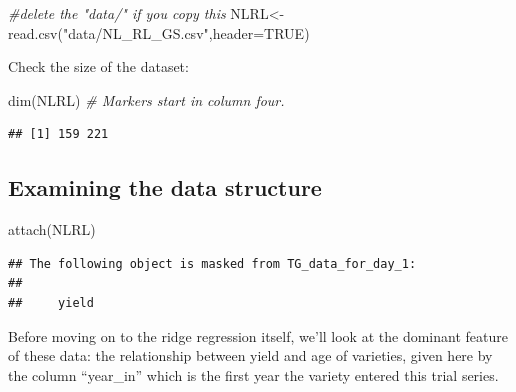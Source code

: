 \documentclass[
]{book}
\newenvironment{Shaded}{\begin{snugshade}}{\end{snugshade}}
\newcommand{\AttributeTok}[1]{\textcolor[rgb]{0.77,0.63,0.00}{#1}}
\newcommand{\CommentTok}[1]{\textcolor[rgb]{0.56,0.35,0.01}{\textit{#1}}}
\newcommand{\ConstantTok}[1]{\textcolor[rgb]{0.00,0.00,0.00}{#1}}
\newcommand{\FunctionTok}[1]{\textcolor[rgb]{0.00,0.00,0.00}{#1}}
\newcommand{\NormalTok}[1]{#1}
\newcommand{\OtherTok}[1]{\textcolor[rgb]{0.56,0.35,0.01}{#1}}
\newcommand{\SpecialCharTok}[1]{\textcolor[rgb]{0.00,0.00,0.00}{#1}}
\newcommand{\StringTok}[1]{\textcolor[rgb]{0.31,0.60,0.02}{#1}}
\begin{document}
\begin{Shaded}
\begin{Highlighting}[]
\CommentTok{\#delete the "data/" if you copy this}
\NormalTok{NLRL}\OtherTok{\textless{}{-}}\FunctionTok{read.csv}\NormalTok{(}\StringTok{"data/NL\_RL\_GS.csv"}\NormalTok{,}\AttributeTok{header=}\ConstantTok{TRUE}\NormalTok{)}
\end{Highlighting}
\end{Shaded}

Check the size of the dataset:

\begin{Shaded}
\begin{Highlighting}[]
\FunctionTok{dim}\NormalTok{(NLRL) }\CommentTok{\# Markers start in column four.}
\end{Highlighting}
\end{Shaded}

\begin{verbatim}
## [1] 159 221
\end{verbatim}

\hypertarget{examining-the-data-structure}{%
\subsection{Examining the data structure}\label{examining-the-data-structure}}

\begin{Shaded}
\begin{Highlighting}[]
\FunctionTok{attach}\NormalTok{(NLRL)}
\end{Highlighting}
\end{Shaded}

\begin{verbatim}
## The following object is masked from TG_data_for_day_1:
## 
##     yield
\end{verbatim}

Before moving on to the ridge regression itself, we'll look at the dominant feature of these data: the relationship between yield and age of varieties, given here by the column ``year\_in'' which is the first year the variety entered this trial series.

\begin{Shaded}
\end{Shaded}
\end{document}
